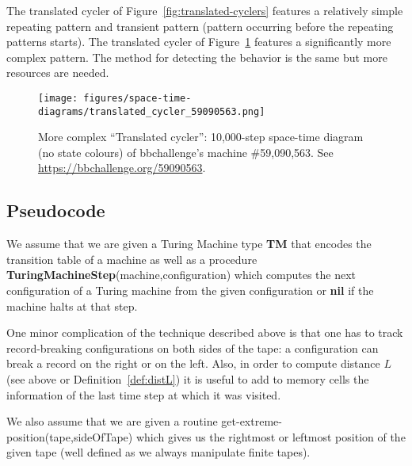 The translated cycler of Figure~\ref{fig:translated-cyclers} features a relatively simple repeating pattern and transient pattern (pattern occurring before the repeating patterns starts). The translated cycler of Figure~\ref{fig:translated-cyclers-more} features a significantly more complex pattern. The method for detecting the behavior is the same but more resources are needed.


\begin{figure}
  \centering
  \texttt{[image: figures/space-time-diagrams/translated\_cycler\_59090563.png]}

  \caption{More complex ``Translated cycler'': 10,000-step space-time diagram (no state colours) of bbchallenge's machine \#59,090,563. See \url{https://bbchallenge.org/59090563}.}\label{fig:translated-cyclers-more}
\end{figure}


\subsection{Pseudocode}

We assume that we are given a Turing Machine type \textbf{TM} that encodes the transition table of a machine as well as a procedure \textbf{TuringMachineStep}(machine,configuration) which computes the next configuration of a Turing machine from the given configuration or \textbf{nil} if the machine halts at that step.

One minor complication of the technique described above is that one has to track record-breaking configurations on both sides of the tape: a configuration can break a record on the right or on the left. Also, in order to compute distance $L$ (see above or Definition~\ref{def:distL}) it is useful to add to memory cells the information of the last time step at which it was visited.

We also assume that we are given a routine {\sc get-extreme-position}(tape,sideOfTape) which gives us the rightmost or leftmost position of the given tape (well defined as we always manipulate finite tapes).

